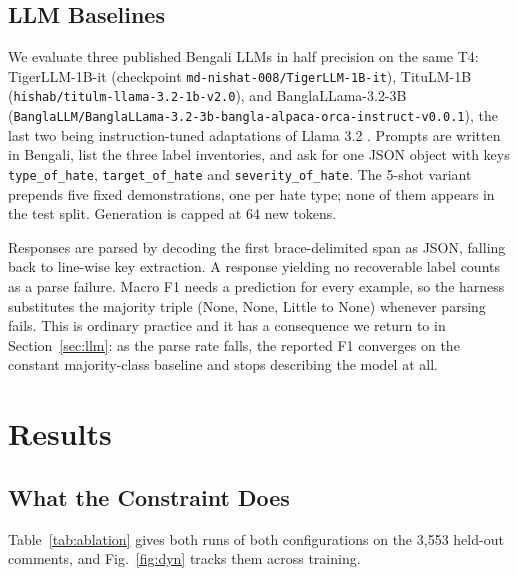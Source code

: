 \documentclass[conference]{IEEEtran}
\begin{document}
\subsection{LLM Baselines}
We evaluate three published Bengali LLMs in half precision on the same T4: TigerLLM-1B-it \cite{raihan2025tigerllm} (checkpoint \texttt{md-nishat-008/TigerLLM-1B-it}), TituLM-1B \cite{hishab2024titullm} (\texttt{hishab/titulm-llama-3.2-1b-v2.0}), and BanglaLLama-3.2-3B \cite{banglallm2024bongllama} (\texttt{BanglaLLM/BanglaLLama-3.2-3b-bangla-alpaca-orca-instruct-v0.0.1}), the last two being instruction-tuned adaptations of Llama 3.2 \cite{touvron2023llama}. Prompts are written in Bengali, list the three label inventories, and ask for one JSON object with keys \texttt{type\_of\_hate}, \texttt{target\_of\_hate} and \texttt{severity\_of\_hate}. The 5-shot variant prepends five fixed demonstrations, one per hate type; none of them appears in the test split. Generation is capped at 64 new tokens.

Responses are parsed by decoding the first brace-delimited span as JSON, falling back to line-wise key extraction. A response yielding no recoverable label counts as a parse failure. Macro F1 needs a prediction for every example, so the harness substitutes the majority triple (None, None, Little to None) whenever parsing fails. This is ordinary practice and it has a consequence we return to in Section~\ref{sec:llm}: as the parse rate falls, the reported F1 converges on the constant majority-class baseline and stops describing the model at all.

\section{Results}
\label{sec:results}

\subsection{What the Constraint Does}
Table~\ref{tab:ablation} gives both runs of both configurations on the 3{,}553 held-out comments, and Fig.~\ref{fig:dyn} tracks them across training.
\end{document}
